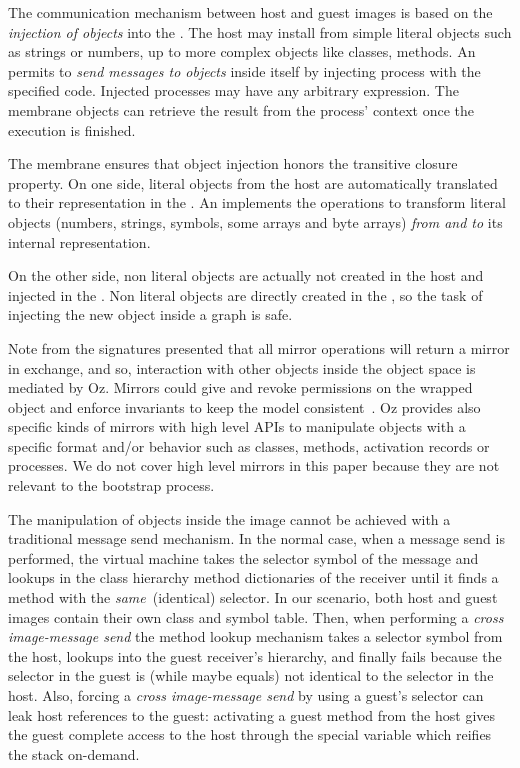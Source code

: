 The communication mechanism between host and guest images is based on the \emph{injection of objects} into the \objectspace. The host may install from simple literal objects such as strings or numbers, up to more complex objects like classes, methods. An \objectspace permits to \emph{send messages to objects} inside itself by injecting process with the specified code. Injected processes may have any arbitrary expression. The membrane objects can retrieve the result from the process' context once the execution is finished.

The \objectspace membrane ensures that object injection honors the transitive closure property. On one side, literal objects from the host are automatically translated to their representation in the \objectspace. An \objectspace implements the operations to transform literal objects (numbers, strings, symbols, some arrays and byte arrays) \emph{from and to} its internal representation.

On the other side, non literal objects are actually not created in the host and injected in the \objectspace. Non literal objects are directly created in the \objectspace, so the task of injecting the new object inside a graph is safe.



Note from the signatures presented that all mirror operations will return a mirror in exchange, and so, interaction with other objects inside the object space is mediated by Oz. Mirrors could give and revoke permissions on the wrapped object and enforce invariants to keep the model consistent~\cite{Teru13a}.
Oz provides also specific kinds of mirrors with high level APIs to manipulate objects with a specific format and/or behavior such as classes, methods, activation records or processes. We do not cover high level mirrors in this paper because they are not relevant to the bootstrap process.


The manipulation of objects inside the \objectspace image cannot be achieved with a traditional message send mechanism. In the normal case, when a message send is performed, the virtual machine takes the selector symbol of the message and lookups in the class hierarchy method dictionaries of the receiver until it finds a method with the \emph{same}~(identical) selector. In our scenario, both host and guest images contain their own  class and symbol table. Then, when performing a \emph{cross image-message send} the method lookup mechanism takes a selector symbol from the host, lookups into the guest receiver's hierarchy, and finally fails because  the selector in the guest is (while maybe equals) not identical to the selector in the host. Also, forcing a \emph{cross image-message send} by using a guest's selector can leak host references to the guest: activating a guest method from the host gives the guest complete access to the host through the  special variable which reifies the stack on-demand.

